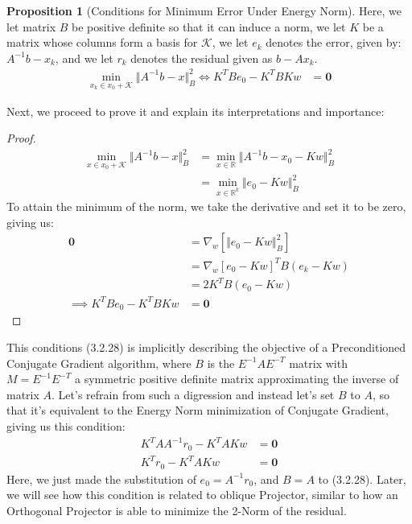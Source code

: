 \documentclass[]{article}
\theoremstyle{definition}
\newtheorem{prop}{Proposition}[section]  %
\begin{document}
            \begin{prop}[Conditions for Minimum Error Under Energy Norm]
                Here, we let matrix $B$ be positive definite so that it can induce a norm, we let $K$ be a matrix whose columns form a basis for $\mathcal K$, we let $e_k$ denotes the error, given by: $A^{-1}b - x_k$, and we let $r_k$ denotes the residual given as $b - Ax_k$. 
                \begin{align}
                    \min_{x_k\in x_0 + \mathcal K}\Vert A^{-1}b - x\Vert_B^2
                    \iff
                    K^TBe_0 - K^TBKw &= \mathbf 0
                \end{align} 
            \end{prop}
            Next, we proceed to prove it and explain its interpretations and importance: 
            \begin{proof}
                \begin{align}
                    \min_{x \in x_0 + \mathcal K}
                    \Vert A^{-1}b - x\Vert_B^2
                    &= 
                    \min_{x\in \mathbb R} 
                    \Vert A^{-1}b - x_0 - Kw\Vert_B^2
                    \\
                    &= \min_{x\in \mathbb R^k}
                    \Vert e_0 - Kw\Vert_B^2
                \end{align}
                To attain the minimum of the norm, we take the derivative and set it to be zero, giving us: 
                \begin{align}
                    \mathbf 0 &= \nabla_w[\Vert e_0 - Kw\Vert_B^2]
                    \\
                    &= \nabla_w[e_0 - Kw]^TB(e_k - Kw)
                    \\
                    &= 2K^TB(e_0 - Kw)
                    \\
                    \implies 
                    K^TBe_0 - K^TBKw &= \mathbf 0
                \end{align}
            \end{proof}
            This conditions (3.2.28) is implicitly describing the objective of a Preconditioned Conjugate Gradient algorithm, where $B$ is the $E^{-1}AE^{-T}$ matrix with $M = E^{-1}E^{-T}$ a symmetric positive definite matrix approximating the inverse of matrix $A$. Let's refrain from such a digression and instead let's set $B$ to $A$, so that it's equivalent to the Energy Norm minimization of Conjugate Gradient, giving us this condition: 
            \begin{align}
                K^TAA^{-1}r_0 - K^TAKw &= \mathbf 0
                \\
                K^Tr_0 - K^TAKw &= \mathbf 0
            \end{align}
            Here, we just made the substitution of $e_0 = A^{-1}r_0$, and $B = A$ to (3.2.28). Later, we will see how this condition is related to oblique Projector, similar to how an Orthogonal Projector is able to minimize the 2-Norm of the residual. 
\fi
\end{document}
